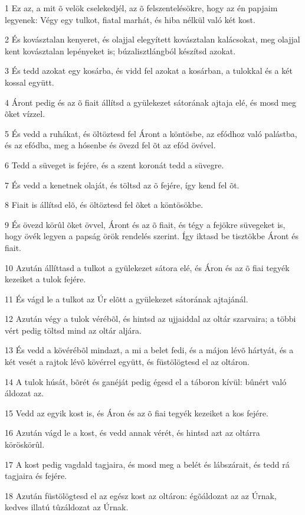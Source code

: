 \par 1 Ez az, a mit õ velök cselekedjél, az õ felszentelésökre, hogy az én papjaim legyenek: Végy egy tulkot, fiatal marhát, és hiba nélkül való két kost.
\par 2 És kovásztalan kenyeret, és olajjal elegyített kovásztalan kalácsokat, meg olajjal kent kovásztalan lepényeket is; búzalisztlángból készítsd azokat.
\par 3 És tedd azokat egy kosárba, és vidd fel azokat a kosárban, a tulokkal és a két kossal együtt.
\par 4 Áront pedig és az õ fiait állítsd a gyülekezet sátorának ajtaja elé, és mosd meg õket vízzel.
\par 5 És vedd a ruhákat, és öltöztesd fel Áront a köntösbe, az efódhoz való palástba, és az efódba, meg a hósenbe és övezd fel õt az efód övével.
\par 6 Tedd a süveget is fejére, és a szent koronát tedd a süvegre.
\par 7 És vedd a kenetnek olaját, és töltsd az õ fejére, így kend fel õt.
\par 8 Fiait is állítsd elõ, és öltöztesd fel õket a köntösökbe.
\par 9 És övezd körûl õket övvel, Áront és az õ fiait, és tégy a fejökre süvegeket is, hogy övék legyen a papság örök rendelés szerint. Így iktasd be tisztökbe Áront és fiait.
\par 10 Azután állíttasd a tulkot a gyülekezet sátora elé, és Áron és az õ fiai tegyék kezeiket a tulok fejére.
\par 11 És vágd le a tulkot az Úr elõtt a gyülekezet sátorának ajtajánál.
\par 12 Azután végy a tulok vérébõl, és hintsd az ujjaiddal az oltár szarvaira; a többi vért pedig töltsd mind az oltár aljára.
\par 13 És vedd a kövérébõl mindazt, a mi a belet fedi, és a májon lévõ hártyát, és a két vesét a rajtok lévõ kövérrel együtt, és füstölögtesd el az oltáron.
\par 14 A tulok húsát, bõrét és ganéját pedig égesd el a táboron kívül: bûnért való áldozat az.
\par 15 Vedd az egyik kost is, és Áron és az õ fiai tegyék kezeiket a kos fejére.
\par 16 Azután vágd le a kost, és vedd annak vérét, és hintsd azt az oltárra köröskörûl.
\par 17 A kost pedig vagdald tagjaira, és mosd meg a belét és lábszárait, és tedd rá tagjaira és fejére.
\par 18 Azután füstölögtesd el az egész kost az oltáron: égõáldozat az az Úrnak, kedves illatú tûzáldozat az Úrnak.
